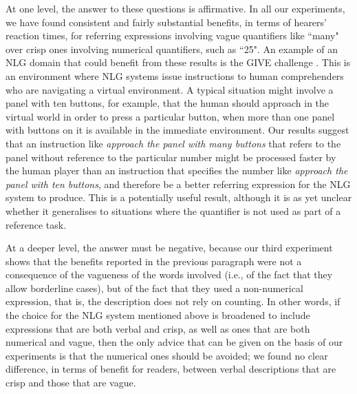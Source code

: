 \documentclass[man,floatmark]{apa}
\begin{document}
At one level, the answer to these questions is affirmative. In all our experiments, we have found consistent and fairly substantial benefits, in terms of hearers' reaction times, for referring expressions involving vague quantifiers like ``many" over crisp ones involving numerical quantifiers, such as ``25". An example of an NLG domain that could benefit from these results is the GIVE challenge \cite{byron2009report} \cite{ koller2010report}. This is an environment where NLG systems issue instructions to human comprehenders who are navigating a virtual environment. A typical situation might involve a panel with ten buttons, for example, that the human should approach in the virtual world in order to press a particular button, when more than one panel with buttons on it is available in the immediate environment. Our results suggest that an instruction like  \emph{approach the panel with many buttons}  that refers to the panel without reference to the particular number might be processed faster by the human player than an instruction that specifies the number like  \emph{approach the panel with ten buttons}, and therefore be a better referring expression for the NLG system to produce. This is a potentially useful result, although it is as yet unclear whether it generalises to situations where the quantifier is not used as part of a reference task.

At a deeper level, the answer must be negative, because our third experiment shows that the benefits reported in the previous paragraph were not a consequence of the vagueness of the words involved (i.e., of the fact that they allow borderline cases), but of the fact that they used a non-numerical expression, that is, the description does not rely on counting. In other words, if the choice for the NLG system mentioned above is broadened to include expressions that are both verbal and crisp, as well as ones that are both numerical and vague, then the only advice that can be given on the basis of our experiments is that the numerical ones should be avoided; we found no clear difference, in terms of benefit for readers, between verbal descriptions that are crisp and those that are vague. 


\end{document}
